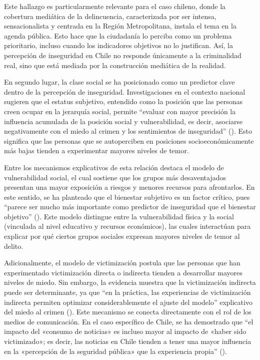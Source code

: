 \documentclass[
  spanish,
  a4paper,
  oneside]{scrbook}
\begin{document}
Este hallazgo es particularmente relevante para el caso chileno, donde
la cobertura mediática de la delincuencia, caracterizada por ser
intensa, sensacionalista y centrada en la Región Metropolitana, instala
el tema en la agenda pública. Esto hace que la ciudadanía lo perciba
como un problema prioritario, incluso cuando los indicadores objetivos
no lo justifican. Así, la percepción de inseguridad en Chile no responde
únicamente a la criminalidad real, sino que está mediada por la
construcción mediática de la realidad.

En segundo lugar, la clase social se ha posicionado como un predictor
clave dentro de la percepción de inseguridad. Investigaciones en el
contexto nacional sugieren que el estatus subjetivo, entendido como la
posición que las personas creen ocupar en la jerarquía social, permite
``evaluar con mayor precisión la influencia acumulada de la posición
social y vulnerabilidad, es decir, asociarse negativamente con el miedo
al crimen y los sentimientos de inseguridad''
(). Esto significa que las personas que se autoperciben en
posiciones socioeconómicamente más bajas tienden a experimentar mayores
niveles de temor.

Entre los mecanismos explicativos de esta relación destaca el modelo de
vulnerabilidad social, el cual sostiene que los grupos más
desaventajados presentan una mayor exposición a riesgos y menores
recursos para afrontarlos. En este sentido, se ha planteado que el
bienestar subjetivo es un factor crítico, pues ``parece ser mucho más
importante como predictor de inseguridad que el bienestar objetivo''
(). Este modelo distingue entre la vulnerabilidad física y la
social (vinculada al nivel educativo y recursos económicos), las cuales
interactúan para explicar por qué ciertos grupos sociales expresan
mayores niveles de temor al delito.

Adicionalmente, el modelo de victimización postula que las personas que
han experimentado victimización directa o indirecta tienden a
desarrollar mayores niveles de miedo. Sin embargo, la evidencia muestra
que la victimización indirecta puede ser determinante, ya que ``en la
práctica, las experiencias de victimización indirecta permiten optimizar
considerablemente el ajuste del modelo'' explicativo del miedo al crimen
(). Este mecanismo se conecta directamente con el rol de los
medios de comunicación. En el caso específico de Chile, se ha demostrado
que ``el impacto del «consumo de noticias» es incluso mayor al impacto
de «haber sido victimizado»; es decir, las noticias en Chile tienden a
tener una mayor influencia en la «percepción de la seguridad pública»
que la experiencia propia''
().
\end{document}
